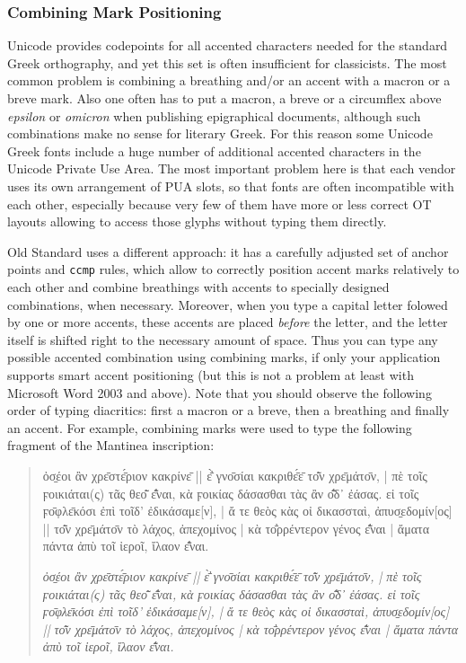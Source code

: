\documentclass[12pt,a4paper,openany]{book}
\begin{document}
\subsubsection{Combining Mark Positioning}

Unicode provides codepoints for all accented characters needed for the
standard Greek orthography, and yet this set is often insufficient for
classicists. The most common problem is combining a breathing and/or an
accent with a macron or a breve mark. Also one often has to put a macron,
a breve or a circumflex above \textit{epsilon} or \textit{omicron} when
publishing epigraphical documents, although such combinations make no sense
for literary Greek. For this reason some Unicode Greek fonts include a huge
number of additional accented characters in the Unicode Private Use Area.
The most important problem here is that each vendor uses its own
arrangement of PUA slots, so that fonts are often incompatible with each
other, especially because very few of them have more or less correct OT
layouts allowing to access those glyphs without typing them directly.

Old Standard uses a different approach: it has a carefully adjusted set of
anchor points and \texttt{ccmp} rules, which allow to correctly position
accent marks relatively to each other and combine breathings with accents
to specially designed combinations, when necessary. Moreover, when you
type a capital letter folowed by one or more accents, these accents are
placed \textit{before} the letter, and the letter itself is shifted right
to the necessary amount of space. Thus you can type any possible accented
combination using combining marks, if only your application supports smart
accent positioning (but this is not a problem at least with Microsoft Word
2003 and above). Note that you should observe the following order of typing
diacritics: first a macron or a breve, then a breathing and finally an
accent. For example, combining marks were used to type the following
fragment of the Mantinea inscription:

\begin{quote}
\large

ὀσ̱έοι ἂν χρε̄στε̄́ριον κακρίνε̄ || ε̄̓̀ γνο̄σίαι κακριθε̄́ε̄ το̄͂ν χρε̄μάτο̄ν, | πὲ τοῖς
ϝοικιάται(ς) τᾶς θεο̄͂ ε̄̓͂ναι, κὰ ϝοικίας δάσασθαι τὰς ἂν ο̄̓͂δ᾽ ἐάσας. εἰ τοῖς
ϝο̄φλε̄κόσι ἐπὶ τοῖδ’ ἐδικάσαμε[ν], | ἄ τε θεὸς κὰς οἰ δικασσταὶ,
ἀπυσ̱εδομίν[ος] || το̄͂ν χρε̄μάτο̄ν τὸ λάχος, ἀπεχομίνος | κὰ το̄̓ρρέντερον γένος
ε̄̓͂ναι | ἄματα πάντα ἀπὺ τοῖ ἰεροῖ, ἴλαον ε̄̓͂ναι.

\smallskip

\itshape
ὀσ̱έοι ἂν χρε̄στε̄́ριον κακρίνε̄ || ε̄̓̀ γνο̄σίαι κακριθε̄́ε̄ το̄͂ν χρε̄μάτο̄ν, | πὲ τοῖς
ϝοικιάται(ς) τᾶς θεο̄͂ ε̄̓͂ναι, κὰ ϝοικίας δάσασθαι τὰς ἂν ο̄̓͂δ᾽ ἐάσας. εἰ τοῖς
ϝο̄φλε̄κόσι ἐπὶ τοῖδ’ ἐδικάσαμε[ν], | ἄ τε θεὸς κὰς οἰ δικασσταὶ,
ἀπυσ̱εδομίν[ος] || το̄͂ν χρε̄μάτο̄ν τὸ λάχος, ἀπεχομίνος | κὰ το̄̓ρρέντερον γένος
ε̄̓͂ναι | ἄματα πάντα ἀπὺ τοῖ ἰεροῖ, ἴλαον ε̄̓͂ναι.

\end{quote}
\end{document}
